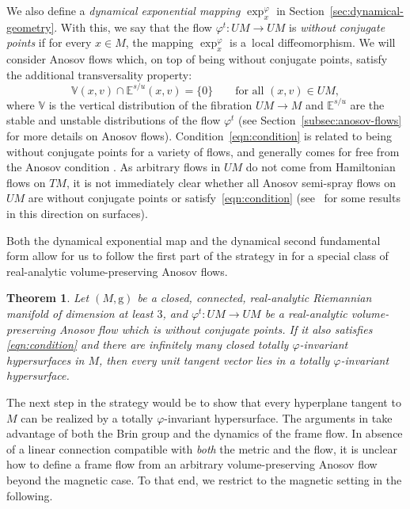 \documentclass[10pt,a4paper]{amsart}
\newcommand{\g}{\mathrm{g}}
\newcommand{\E}{\mathbb{E}}
\numberwithin{equation}{section}
\newtheorem{theoremA}{Theorem}
\theoremstyle{definition}
\begin{document}
We also define a \emph{dynamical exponential mapping} $\exp_x^\varphi$ in Section~\ref{sec:dynamical-geometry}. With this, we say that the flow $\varphi^t \colon UM \rightarrow UM$ is \emph{without conjugate points} if for every $x \in M$, the mapping $\exp_x^{\varphi}$ is a~local diffeomorphism.
We will consider Anosov flows which, on top of being without conjugate points, satisfy the additional transversality property:
\begin{equation} \label{eqn:condition}
 \mathbb{V}(x,v) \cap \E^{s/u}(x,v) = \{0\} \qquad\text{for all }(x,v) \in UM,
\end{equation}
where $\mathbb{V}$ is the vertical distribution of the fibration $UM\to M$ and $\mathbb{E}^{s/u}$ are the stable and unstable distributions of the flow $\varphi^t$ (see Section~\ref{subsec:anosov-flows} for more details on Anosov flows). Condition~\eqref{eqn:condition} is related to being without conjugate points for a variety of flows, and generally comes for free from the Anosov condition \cite{contreras2003asymptotic, Paternains-94-convex}. As arbitrary flows in $UM$ do not come from Hamiltonian flows on $TM$, it is not immediately clear whether all Anosov semi-spray flows on~$UM$ are without conjugate points or satisfy~\eqref{eqn:condition} (see~\cite{cuesta2025creation} for some results in this direction on surfaces).

Both the dynamical exponential map and the dynamical second fundamental form allow for us to follow the first part of the strategy in \cite[Section~3.1]{filip2024finiteness} for a special class of real-analytic volume-preserving Anosov flows.

\begin{theoremA} \label{thm:vol-preserving}
 Let $(M,\g)$ be a closed, connected, real-analytic Riemannian manifold of dimension at least $3$, and $\varphi^t\colon UM\to UM$ be a real-analytic volume-preserving Anosov flow which is without conjugate points. If it also satisfies \eqref{eqn:condition} and there are infinitely many closed totally $\varphi$-invariant hypersurfaces in $M$, then every unit tangent vector lies in a totally $\varphi$-invariant hypersurface.
\end{theoremA}

The next step in the strategy would be to show that every hyperplane tangent to $M$ can be realized by a totally $\varphi$-invariant hypersurface. The arguments in \cite{filip2024finiteness} take advantage of both the Brin group and the dynamics of the frame flow. In absence of a linear connection compatible with \emph{both} the metric and the flow, it is unclear how to define a frame flow from an arbitrary volume-preserving Anosov flow beyond the magnetic case. To that end, we restrict to the magnetic setting in the following.
\end{document}
